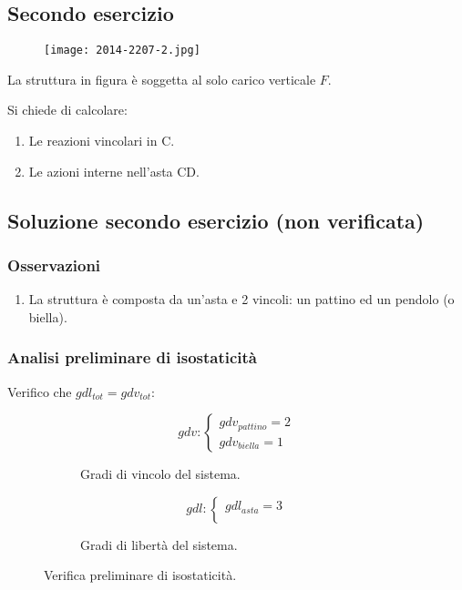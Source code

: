 \documentclass[main.tex]{subfiles}
\begin{document}
\subsection{Secondo esercizio}

\begin{figure}[H]
\centering
\texttt{[image: 2014-2207-2.jpg]}
\end{figure}

La struttura in figura è soggetta al solo carico verticale $F$.

Si chiede di calcolare:

\begin{enumerate}
\item Le reazioni vincolari in C.
\item Le azioni interne nell’asta CD.
\end{enumerate}

\clearpage

\subsection{Soluzione secondo esercizio (non verificata)}

\subsubsection{Osservazioni}

\begin{enumerate}
\item La struttura è composta da un'asta e 2 vincoli: un pattino ed un pendolo (o biella).
\end{enumerate}

\subsubsection{Analisi preliminare di isostaticità}
Verifico che $gdl_{tot} = gdv_{tot}$:
\begin{figure}[H]
  \begin{subfigure}[b]{.5\textwidth}
  \centering
  \[
  	gdv: \begin{cases}
		gdv_{pattino} = 2\\
		gdv_{biella} = 1
  	\end{cases}
  \]
  \caption{Gradi di vincolo del sistema.}
  \end{subfigure}
  \hfill
  \begin{subfigure}[b]{.5\textwidth}
  \centering
  \[
  	gdl: \begin{cases}
  		gdl_{asta} = 3\\
  	\end{cases}
  \]
  \caption{Gradi di libertà del sistema.}
  \end{subfigure}
  \caption{Verifica preliminare di isostaticità.}
\end{figure}
\end{document}
